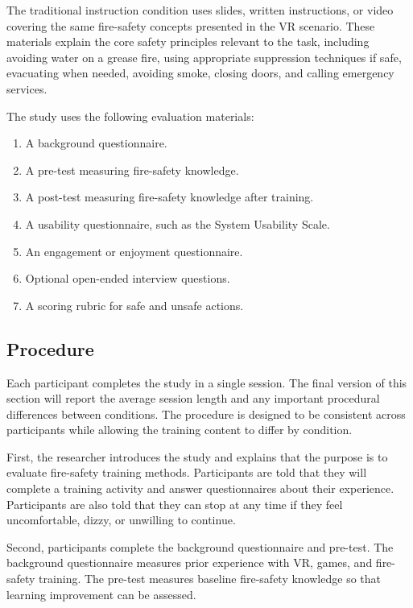 \documentclass[manuscript, review]{acmart}
\begin{document}
{The traditional instruction condition uses slides, written instructions, or video covering the same fire-safety concepts presented in the VR scenario. These materials explain the core safety principles relevant to the task, including avoiding water on a grease fire, using appropriate suppression techniques if safe, evacuating when needed, avoiding smoke, closing doors, and calling emergency services.

The study uses the following evaluation materials:

\begin{enumerate}
  \item A background questionnaire.
  \item A pre-test measuring fire-safety knowledge.
  \item A post-test measuring fire-safety knowledge after training.
  \item A usability questionnaire, such as the System Usability Scale.
  \item An engagement or enjoyment questionnaire.
  \item Optional open-ended interview questions.
  \item A scoring rubric for safe and unsafe actions.
\end{enumerate}

\subsection{Procedure}

Each participant completes the study in a single session. The final version of this section will report the average session length and any important procedural differences between conditions. The procedure is designed to be consistent across participants while allowing the training content to differ by condition.

First, the researcher introduces the study and explains that the purpose is to evaluate fire-safety training methods. Participants are told that they will complete a training activity and answer questionnaires about their experience. Participants are also told that they can stop at any time if they feel uncomfortable, dizzy, or unwilling to continue.

Second, participants complete the background questionnaire and pre-test. The background questionnaire measures prior experience with VR, games, and fire-safety training. The pre-test measures baseline fire-safety knowledge so that learning improvement can be assessed.

}
\end{document}

